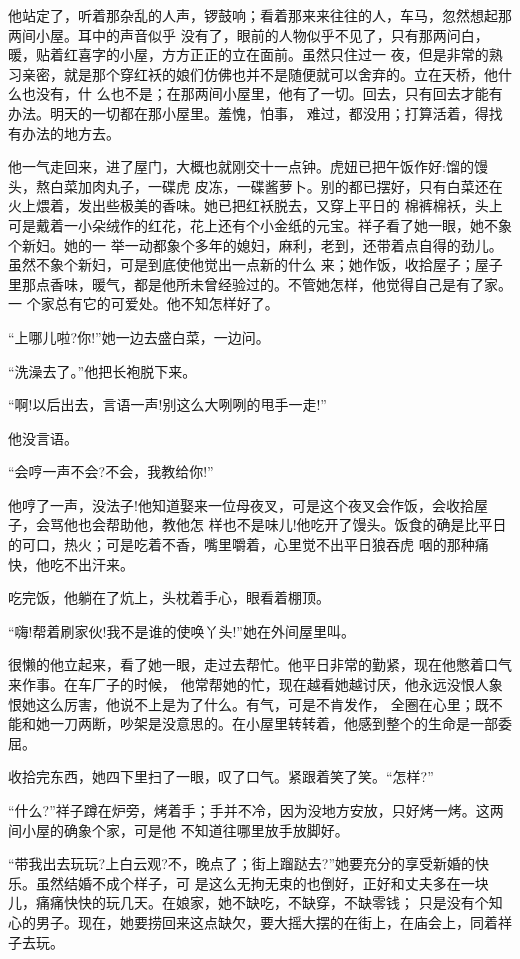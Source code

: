 \documentclass[11pt,a4paper,onecolumn]{article}
\begin{document}
他站定了，听着那杂乱的人声，锣鼓响；看着那来来往往的人，车马，忽然想起那两间小屋。耳中的声音似乎
没有了，眼前的人物似乎不见了，只有那两问白，暖，贴着红喜字的小屋，方方正正的立在面前。虽然只住过一
夜，但是非常的熟习亲密，就是那个穿红袄的娘们仿佛也并不是随便就可以舍弃的。立在天桥，他什么也没有，什
么也不是；在那两间小屋里，他有了一切。回去，只有回去才能有办法。明天的一切都在那小屋里。羞愧，怕事，
难过，都没用；打算活着，得找有办法的地方去。

他一气走回来，进了屋门，大概也就刚交十一点钟。虎妞已把午饭作好:馏的馒头，熬白菜加肉丸子，一碟虎
皮冻，一碟酱萝卜。别的都已摆好，只有白菜还在火上煨着，发出些极美的香味。她已把红袄脱去，又穿上平日的
棉裤棉袄，头上可是戴着一小朵绒作的红花，花上还有个小金纸的元宝。祥子看了她一眼，她不象个新妇。她的一
举一动都象个多年的媳妇，麻利，老到，还带着点自得的劲儿。虽然不象个新妇，可是到底使他觉出一点新的什么
来；她作饭，收拾屋子；屋子里那点香味，暖气，都是他所未曾经验过的。不管她怎样，他觉得自己是有了家。一
个家总有它的可爱处。他不知怎样好了。

``上哪儿啦?你!''她一边去盛白菜，一边问。

``洗澡去了。''他把长袍脱下来。

``啊!以后出去，言语一声!别这么大咧咧的甩手一走!''

他没言语。

``会哼一声不会?不会，我教给你!''

他哼了一声，没法子!他知道娶来一位母夜叉，可是这个夜叉会作饭，会收拾屋子，会骂他也会帮助他，教他怎
样也不是味儿!他吃开了馒头。饭食的确是比平日的可口，热火；可是吃着不香，嘴里嚼着，心里觉不出平日狼吞虎
咽的那种痛快，他吃不出汗来。

吃完饭，他躺在了炕上，头枕着手心，眼看着棚顶。

``嗨!帮着刷家伙!我不是谁的使唤丫头!''她在外间屋里叫。

很懒的他立起来，看了她一眼，走过去帮忙。他平日非常的勤紧，现在他憋着口气来作事。在车厂子的时候，
他常帮她的忙，现在越看她越讨厌，他永远没恨人象恨她这么厉害，他说不上是为了什么。有气，可是不肯发作，
全圈在心里；既不能和她一刀两断，吵架是没意思的。在小屋里转转着，他感到整个的生命是一部委屈。

收拾完东西，她四下里扫了一眼，叹了口气。紧跟着笑了笑。``怎样?''

``什么?''祥子蹲在炉旁，烤着手；手并不冷，因为没地方安放，只好烤一烤。这两间小屋的确象个家，可是他
不知道往哪里放手放脚好。

``带我出去玩玩?上白云观?不，晚点了；街上蹓跶去?''她要充分的享受新婚的快乐。虽然结婚不成个样子，可
是这么无拘无束的也倒好，正好和丈夫多在一块儿，痛痛快快的玩几天。在娘家，她不缺吃，不缺穿，不缺零钱；
只是没有个知心的男子。现在，她要捞回来这点缺欠，要大摇大摆的在街上，在庙会上，同着祥子去玩。
\end{document}
